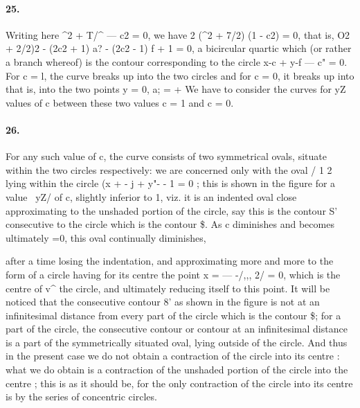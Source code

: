 \documentclass[11pt,a4paper]{book}
\begin{document}
{{{{{\paragraph{25.} Writing  here  ^2  +  T/^  ---  c2  =  0,  we  have
2  (^2  +  7/2)  (1  -  c2)  =  0,
that  is,
O2  +  2/2)2  -  (2c2  +  1)  a?  -  (2c2  -  1)  f  +  1  =  0,
a   bicircular   quartic    which    (or   rather   a    branch    whereof)    is    the    contour    corresponding
to  the  circle  x-c  +  y-f  ---  c"  =  0.     For  c  =  l,  the  curve  breaks  up  into  the  two  circles
and  for  c  =  0,  it  breaks  up  into
that   is,   into   the    two   points   y  =  0,   a;  =  +  We    have    to    consider    the    curves    for
yZ
values  of  c  between  these  two  values  c  =  1  and  c  =  0.
\paragraph{26.} For    any    such    value    of    c,    the    curve     consists    of    two    symmetrical     ovals,
situate    within    the    two    circles    respectively:     we    are    concerned    only    with    the    oval
   /          1  2
lying   within    the    circle    (x  +  -     j  +  y"-  -  1  =  0  ;    this    is    shown    in    the   figure    for  a  value
\  yZ/
of  c,  slightly  inferior  to  1,  viz.  it  is  an  indented  oval  close  approximating  to  the
unshaded  portion  of  the  circle,  say  this  is  the  contour  S'  consecutive  to  the  circle
which  is  the  contour  \$.
As    c    diminishes    and    becomes    ultimately    =0,    this    oval    continually    diminishes,


after   a   time   losing   the   indentation,   and    approximating    more    and    more    to   the   form
of  a    circle    having    for    its    centre    the    point   x  =  --- -/,,,   2/  =  0,   which    is   the   centre   of
v^
the  circle,  and  ultimately  reducing  itself  to  this  point.
It  will  be  noticed  that  the  consecutive  contour  8'  as  shown  in  the  figure  is  not
at  an  infinitesimal  distance  from  every  part  of  the  circle  which  is  the  contour  \$;
for  a  part  of  the  circle,  the  consecutive  contour  or  contour  at  an  infinitesimal  distance
is  a  part  of  the  symmetrically  situated  oval,  lying  outside  of  the  circle.  And  thus
in  the  present  case  we  do  not  obtain  a  contraction  of  the  circle  into  its  centre :
what  we  do  obtain  is  a  contraction  of  the  unshaded  portion  of  the  circle  into  the
centre ;  this  is  as  it  should  be,  for  the  only  contraction  of  the  circle  into  its  centre
is  by  the  series  of  concentric  circles.
}}}}}
\end{document}
